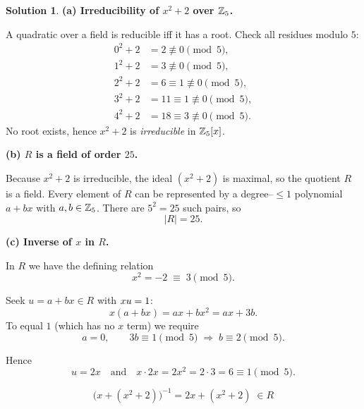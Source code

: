 \documentclass[12pt]{article}
\theoremstyle{definition} %
\newtheorem{solution}{Solution}
\theoremstyle{plain} %
\begin{document}
              \begin{solution}
              \bigskip
              \textbf{(a)  Irreducibility of \(x^{2}+2\) over \(\Bbb Z_{5}\).}
              
              A quadratic over a field is reducible iff it has a root.
              Check all residues modulo \(5\):
              \[
                 \begin{aligned}
                 0^{2}+2 &= 2\not\equiv0\pmod5,\\
                 1^{2}+2 &= 3\not\equiv0\pmod5,\\
                 2^{2}+2 &= 6\equiv1\not\equiv0\pmod5,\\
                 3^{2}+2 &= 11\equiv1\not\equiv0\pmod5,\\
                 4^{2}+2 &= 18\equiv3\not\equiv0\pmod5.
                 \end{aligned}
              \]
              No root exists, hence \(x^{2}+2\) is \emph{irreducible} in
              \(\Bbb Z_{5}[x]\).
              
              \bigskip
              \textbf{(b)  \(R\) is a field of order \(25\).}
              
              Because \(x^{2}+2\) is irreducible, the ideal \((x^{2}+2)\) is maximal,
              so the quotient \(R\) is a field.  
              Every element of \(R\) can be represented by a degree–\(\le1\) polynomial
              \(a+bx\) with \(a,b\in\Bbb Z_{5}\).
              There are \(5^{2}=25\) such pairs, so
              \[
                 |R|=25.
              \]
              
              \bigskip
              \textbf{(c)  Inverse of \(x\) in \(R\).}
              
              In \(R\) we have the defining relation
              \[
                 x^{2} = -2 \;\equiv\; 3 \pmod5.
              \]
              
              Seek \(u=a+bx\in R\) with \(x\*u = 1\):
              \[
                 x(a+bx)=ax + b x^{2} = a x + 3b.
              \]
              To equal \(1\) (which has no \(x\) term) we require
              \[
                 a = 0,
                 \qquad
                 3b \equiv 1 \pmod5
                 \;\Longrightarrow\;
                 b \equiv 2 \pmod5.
              \]
              
              Hence
              \[
                 u = 2x \quad\text{and}\quad
                 x\cdot 2x = 2x^{2} = 2\cdot 3 = 6 \equiv 1\pmod5.
              \]
              
              \[
                 \boxed{\;
                   \bigl(x+(x^{2}+2)\bigr)^{-1}
                     = 2x +(x^{2}+2)\;\in R
                 \;}
              \]
              \end{solution}
\end{document}
